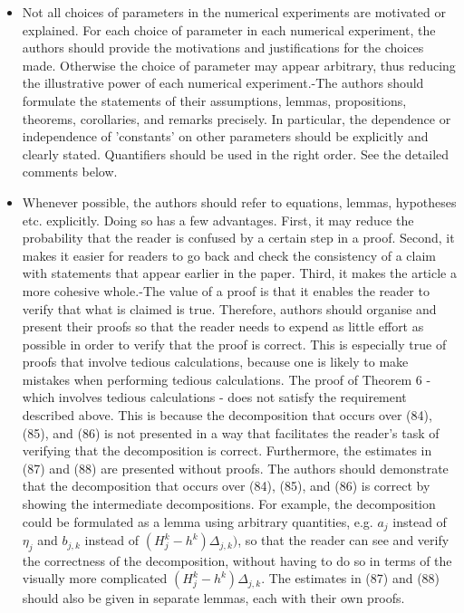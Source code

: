 \documentclass{article}
\begin{document}
	\begin{itemize}[label=-]
	\item Not all choices of parameters in the numerical experiments are motivated or explained. For each choice of parameter in each numerical experiment, the authors should provide the motivations and justifications for the choices made. Otherwise the choice of parameter may appear arbitrary, thus reducing the illustrative power of each numerical experiment.-The authors should formulate the statements of their assumptions, lemmas, propositions, theorems, corollaries, and remarks precisely. In particular, the dependence or independence of 'constants' on other parameters should be explicitly and clearly stated. Quantifiers should be used in the right order. See the detailed comments below.
	\item Whenever possible, the authors should refer to equations, lemmas, hypotheses etc. explicitly. Doing so has a few advantages. First, it may reduce the probability that the reader is confused by a certain step in a proof. Second, it makes it easier for readers to go back and check the consistency of a claim with statements that appear earlier in the paper. Third, it makes the article a more cohesive whole.-The value of a proof is that it enables the reader to verify that what is claimed is true. Therefore, authors should organise and present their proofs so that the reader needs to expend as little effort as possible in order to verify that the proof is correct. This is especially true of proofs that involve tedious calculations, because one is likely to make mistakes when performing tedious calculations. The proof of Theorem 6 - which involves tedious calculations - does not satisfy the requirement described above. This is because the decomposition that occurs over (84), (85), and (86) is not presented in a way that facilitates the reader's task of verifying that the decomposition is correct. Furthermore, the estimates in (87) and (88) are presented without proofs. The authors should demonstrate that the decomposition that occurs over (84), (85), and (86) is correct by showing the intermediate decompositions. For example, the decomposition could be formulated as a lemma using arbitrary quantities, e.g. $a_j$ instead of $\eta_j$ and $b_{j,k}$ instead of $(H^k_j-h^k)\Delta_{j,k})$, so that the reader can see and verify the correctness of the decomposition, without having to do so in terms of the visually more complicated $(H^k_j-h^k)\Delta_{j,k}$. The estimates in (87) and (88) should also be given in separate lemmas, each with their own proofs. 
	\end{itemize}
	
\end{document}
